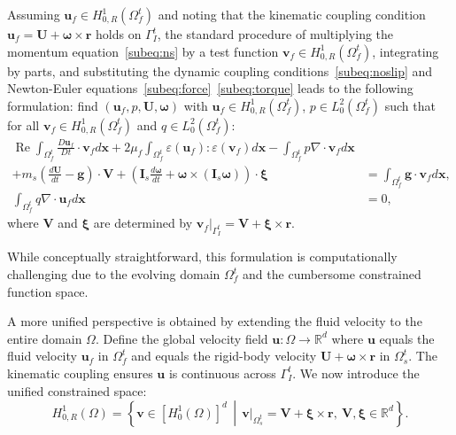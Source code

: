 \documentclass{article}
\newcommand{\bx}{{\mathbf{x}}}
\newcommand{\bu}{{\mathbf{u}}}
\newcommand{\bv}{{\mathbf{v}}}
\newcommand{\br}{{\mathbf{r}}}
\newcommand{\Reynolds}{{\operatorname{Re}}}
\begin{document}
Assuming $\bu_f \in H_{0,R}^1(\Omega_f^t)$ and noting that the kinematic coupling condition $\bu_f = \mathbf{U} + \boldsymbol{\omega} \times \mathbf{r}$ holds on $\Gamma_I^t$, the standard procedure of multiplying the momentum equation~\eqref{subeq:ns} by a test function $\bv_f \in H_{0,R}^1(\Omega_f^t)$, integrating by parts, and substituting the dynamic coupling conditions~\eqref{subeq:noslip} and Newton-Euler equations~\eqref{subeq:force}~\eqref{subeq:torque} leads to the following formulation: find $(\bu_f, p, \mathbf{U}, \boldsymbol{\omega})$ with $\bu_f \in H_{0,R}^1(\Omega_f^t)$, $p \in L^2_0(\Omega_f^t)$ such that for all $\bv_f \in H_{0,R}^1(\Omega_f^t)$ and $q \in L^2_0(\Omega_f^t)$:
\begin{equation}\label{eq:weak_system_fluid_domain}
\begin{aligned}
\Reynolds \int_{\Omega_f^t} \frac{D\bu_f}{Dt} \cdot \bv_f d\bx
+ 2\mu_f \int_{\Omega_f^t} \varepsilon(\bu_f) : \varepsilon(\bv_f) d\bx
- \int_{\Omega_f^t} p \nabla \cdot \bv_f d\bx \\
+ m_s \left( \frac{d\mathbf{U}}{dt} - \mathbf{g} \right) \cdot \mathbf{V}
+ \left( \mathbf{I}_s \frac{d\boldsymbol{\omega}}{dt} + \boldsymbol{\omega} \times (\mathbf{I}_s \boldsymbol{\omega}) \right) \cdot \boldsymbol{\xi}
&= \int_{\Omega_f^t} \mathbf{g} \cdot \bv_f d\bx, \\
\int_{\Omega_f^t} q \nabla \cdot \bu_f d\bx &= 0,
\end{aligned}
\end{equation}
where $\mathbf{V}$ and $\boldsymbol{\xi}$ are determined by $\bv_f|_{\Gamma_I^t} = \mathbf{V} + \boldsymbol{\xi} \times \mathbf{r}$.

While conceptually straightforward, this formulation is computationally challenging due to the evolving domain $\Omega_f^t$ and the cumbersome constrained function space.

A more unified perspective is obtained by extending the fluid velocity to the entire domain $\Omega$. Define the global velocity field $\bu : \Omega \to \mathbb{R}^d$ where $\bu$ equals the fluid velocity $\bu_f$ in $\Omega_f^t$ and equals the rigid-body velocity $\mathbf{U} + \boldsymbol{\omega} \times \br$ in $\Omega_s^t$. The kinematic coupling ensures $\bu$ is continuous across $\Gamma_I^t$. We now introduce the unified constrained space:
\begin{equation}\label{eq:unified_test_space}
H_{0,R}^1(\Omega) = \left\{ \bv \in [H_0^1(\Omega)]^d \,\middle|\, 
\bv|_{\Omega_s^t} = \mathbf{V} + \boldsymbol{\xi} \times \br,\ 
\mathbf{V}, \boldsymbol{\xi} \in \mathbb{R}^d \right\}.
\end{equation}
\end{document}
